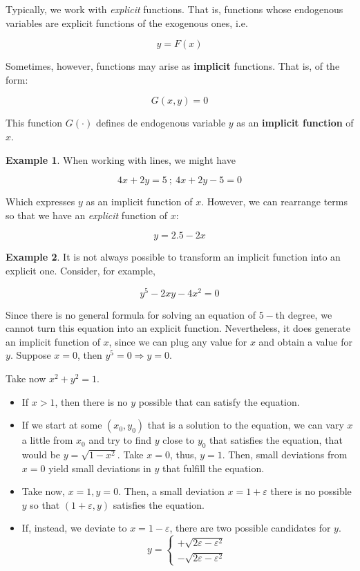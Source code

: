 \documentclass[a4paper,11pt]{article}
\theoremstyle{definition}
\newtheorem{example}{Example}
\theoremstyle{plain}
\begin{document}
Typically, we work with \emph{explicit} functions. That is, functions
whose endogenous variables are explicit functions of the exogenous ones,
i.e.

\[
y = F(x)
\]

Sometimes, however, functions may arise as \textbf{implicit} functions.
That is, of the form:

\[
G(x, y) = 0
\]

This function \(G(\cdot)\) defines de endogenous variable \(y\) as an
\textbf{implicit function} of \(x\).

\begin{example}
When working with lines, we might have

\[
4x + 2y = 5 \ ; \ 4x + 2y - 5 = 0
\]

Which expresses \(y\) as an implicit function of \(x\). However, we can
rearrange terms so that we have an \emph{explicit} function of \(x\):

\[
y = 2.5 - 2x 
\]
\end{example}

\begin{example}
It is not always possible to transform an implicit
function into an explicit one. Consider, for example,

\[
y^5 - 2xy - 4x^2 = 0
\]

Since there is no general formula for solving an equation of \(5-\)th
degree, we cannot turn this equation into an explicit function.
Nevertheless, it does generate an implicit function of \(x\), since we
can plug any value for \(x\) and obtain a value for \(y\). Suppose
\(x = 0\), then \(y^5 = 0 \Rightarrow y = 0\).
\end{example}

Take now \(x^2 + y^2 = 1\).

\begin{itemize}
\item
  If \(x > 1\), then there is no \(y\) possible that can satisfy the
  equation.
\item
  If we start at some \((x_0, y_0)\) that is a solution to the equation,
  we can vary \(x\) a little from \(x_0\) and try to find \(y\) close to
  \(y_0\) that satisfies the equation, that would be
  \(y = \sqrt{1-x^2}\). Take \(x = 0\), thus, \(y = 1\). Then, small
  deviations from \(x = 0\) yield small deviations in \(y\) that fulfill
  the equation.
\item
  Take now, \(x = 1, y = 0\). Then, a small deviation
  \(x = 1 + \varepsilon\) there is no possible \(y\) so that
  \((1+\varepsilon,y)\) satisfies the equation.
\item
  If, instead, we deviate to \(x = 1-\varepsilon\), there are two
  possible candidates for \(y\). \[
  y = \begin{cases}
  +\sqrt{2\varepsilon-\varepsilon^2} \\
  -\sqrt{2\varepsilon-\varepsilon^2}
  \end{cases}
  \]
\end{itemize}
\end{document}
